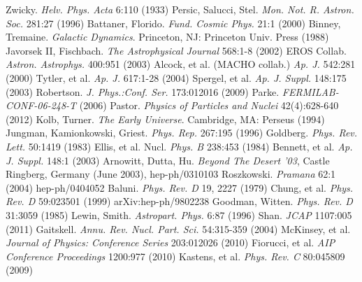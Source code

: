 \documentclass[a4paper,12pt]{article}
\begin{document}
{\singlespacing
\begin{thebibliography}{1}

 Zwicky.  \emph{Helv. Phys. Acta} 6:110 (1933)
 Persic, Salucci, Stel.  \emph{Mon. Not. R. Astron. Soc.} 281:27 (1996)
 Battaner, Florido.  \emph{Fund. Cosmic Phys.} 21:1 (2000)
 Binney, Tremaine. \emph{Galactic Dynamics}. Princeton, NJ: Princeton Univ. Press (1988)
 Javorsek II, Fischbach. \emph{The Astrophysical Journal} 568:1-8 (2002)
 EROS Collab.  \emph{Astron. Astrophys.} 400:951 (2003)
 Alcock, et al. (MACHO collab.)  \emph{Ap. J.} 542:281 (2000)
 Tytler, et al. \emph{Ap. J.} 617:1-28 (2004)
 Spergel, et al. \emph{Ap. J. Suppl.} 148:175 (2003)
 Robertson. \emph{J. Phys.:Conf. Ser.} 173:012016 (2009)
 Parke.  \emph{FERMILAB-CONF-06-248-T} (2006)
 Pastor.  \emph{Physics of Particles and Nuclei} 42(4):628-640 (2012)
 Kolb, Turner. \emph{The Early Universe}.  Cambridge, MA: Perseus (1994)
 Jungman, Kamionkowski, Griest.  \emph{Phys. Rep.} 267:195 (1996)
 Goldberg.  \emph{Phys. Rev. Lett.} 50:1419 (1983)
 Ellis, et al. Nucl. \emph{Phys. B} 238:453 (1984)
 Bennett, et al. \emph{Ap. J. Suppl.} 148:1 (2003)
 Arnowitt, Dutta, Hu. \emph{Beyond The Desert '03}, Castle Ringberg, Germany (June 2003), hep-ph/0310103
 Roszkowski.  \emph{Pramana} 62:1 (2004) hep-ph/0404052
 Baluni. \emph{Phys. Rev. D} 19, 2227 (1979)
 Chung, et al.  \emph{Phys. Rev. D} 59:023501 (1999) arXiv:hep-ph/9802238
 Goodman, Witten. \emph{Phys. Rev. D} 31:3059 (1985)
 Lewin, Smith. \emph{Astropart. Phys.} 6:87 (1996)
 Shan. \emph{JCAP} 1107:005 (2011)
 Gaitskell.  \emph{Annu. Rev. Nucl. Part. Sci.} 54:315-359 (2004)
 McKinsey, et al.  \emph{Journal of Physics: Conference Series} 203:012026 (2010) 
 Fiorucci, et al.  \emph{AIP Conference Proceedings} 1200:977 (2010)
 Kastens, et al. \emph{Phys. Rev. C} 80:045809 (2009)


\end{thebibliography}}
\end{document}

